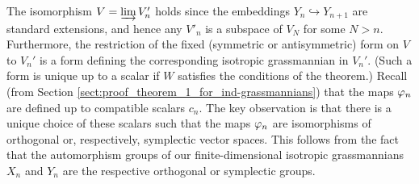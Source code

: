\documentclass[11pt, a4paper]{article}
\begin{document}
The isomorphism $V=\varinjlim V'_n$ holds since the embeddings $Y_n \hookrightarrow Y_{n+1}$ are standard extensions, and hence any $V'_n$ is a subspace of $V_N$ for some $N>n$. Furthermore, the restriction of the fixed (symmetric or antisymmetric) form on $V$ to $V_n'$ is a form defining the corresponding isotropic grassmannian in $V_n'$. (Such a form is unique up to a scalar if $W$ satisfies the conditions of the theorem.) Recall (from Section \ref{sect:proof_theorem_1_for_ind-grassmannians}) that the maps $\varphi_n$ are defined up to compatible scalars $c_n$.
The key observation is that there is a unique choice of these scalars such that the maps $\varphi_n$ are isomorphisms of orthogonal or, respectively, symplectic vector spaces. This follows from the fact that the automorphism groups of our finite-dimensional isotropic grassmannians $X_n$ and $Y_n$ are the respective orthogonal or  symplectic groups. %
\end{document}
